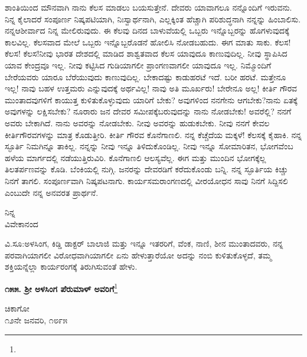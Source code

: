 ಶಾಂತಿಯಿಂದ ಮೌನವಾಗಿ ನಾನು ಕೆಲಸ ಮಾಡಲು ಬಯಸುತ್ತೇನೆ. ದೇವರು ಯಾವಾಗಲೂ ನನ್ನೊಂದಿಗೆ ಇರುವನು. ನಿನ್ನ ಕೈಲಾದರೆ ಸಂಪೂರ್ಣ ನಿಷ್ಕಪಟಿಯಾಗಿ, ನಿಃಸ್ವಾರ್ಥನಾಗಿ, ಎಲ್ಲಕ್ಕಿಂತ ಹೆಚ್ಚಾಗಿ ಪರಿಶುದ್ಧನಾಗಿ ನನ್ನನ್ನು ಹಿಂಬಾಲಿಸು. ನನ್ನ\break ಆಶೀರ್ವಾದ ನಿನ್ನ ಮೇಲಿರುವುದು. ಈ ಕೆಲವು ದಿನದ ಬಾಳುವೆಯಲ್ಲಿ ಒಬ್ಬರು ಇನ್ನೊಬ್ಬರನ್ನು ಹೊಗಳುವುದಕ್ಕೆ ಕಾಲವಿಲ್ಲ. ಕೆಲಸವಾದ ಮೇಲೆ ಒಬ್ಬರು ಇನ್ನೊಬ್ಬರೊಡನೆ ಹೋಲಿಸಿ ನೋಡಬಹುದು. ಈಗ ಮಾತು ಸಾಕು. ಕೆಲಸ! ಕೆಲಸ! ಕೆಲಸ!ನೀವು ಭಾರತ ದೇಶದಲ್ಲಿ ಮಾಡಿದ ಶಾಶ್ವತವಾದ ಕೆಲಸ ಯಾವುದೂ ಕಾಣುವುದಿಲ್ಲ. ನೀವು ಸ್ಥಾಪಿಸಿದ ಯಾವ ಕೇಂದ್ರವೂ ಇಲ್ಲ. ನೀವು ಕಟ್ಟಿಸಿದ ಗುಡಿಯಾಗಲೀ ಪ್ರಾಂಗಣವಾಗಲೀ ಯಾವುದೂ ಇಲ್ಲ. ನಿಮ್ಮೊಂದಿಗೆ ಬೇರೆಯವರು ಯಾರೂ ಬೆರೆಯುವುದು ಕಾಣುವುದಿಲ್ಲ. ಬೇಕಾದಷ್ಟು ಕಾಡುಹರಟೆ ಇದೆ. ಬರೀ ಹರಟೆ. ಮತ್ತೇನೂ ಇಲ್ಲ! ನಾವು ಬಹಳ ಉತ್ತಮರು ಎನ್ನುವುದಕ್ಕೆ ಅರ್ಥವಿಲ್ಲ! ನಾವು ಅತಿ ಮೂರ್ಖರು! ಬೇರೇನೂ ಅಲ್ಲ! ಕೀರ್ತಿ ಗೌರವ ಮುಂತಾದವುಗಳಿಗೆ ಕಾಯುತ್ತ ಕುಳಿತುಕೊಳ್ಳುವುದು ಯಾರಿಗೆ ಬೇಕು? ಅವುಗಳಿಂದ ನನಗೇನು ಆಗಬೇಕು?ನಾನು ಏತಕ್ಕೆ ಅವುಗಳನ್ನು ಲಕ್ಷಿಸಬೇಕು? ನೂರಾರು ಜನ ದೇವರ ಸಮೀಪಕ್ಕೆ\break ಬರುವುದನ್ನು ನಾನು ನೋಡಬೇಕು! ಅವರೆಲ್ಲಿ? ನನಗೆ ಅವರು ಬೇಕಾಗಿದೆ. ನಾನು ಅವರನ್ನು ನೋಡಬೇಕು. ನೀವು ಅವರನ್ನು ಹುಡುಕಬೇಕು. ನೀವು ನನಗೆ ಕೇವಲ ಕೀರ್ತಿಗೌರವಗಳನ್ನು ಮಾತ್ರ ಕೊಡುತ್ತೀರಿ. ಕೀರ್ತಿ ಗೌರವ ಕೊನೆಗಾಣಲಿ. ನನ್ನ ಕೆಚ್ಚೆದೆಯ ಮಕ್ಕಳೆ! ಕೆಲಸಕ್ಕೆ ಕೈಹಾಕಿ. ನನ್ನ ಸ್ಫೂರ್ತಿ ನಿಮಗಿನ್ನೂ ತಾಕಿಲ್ಲ. ನನ್ನನ್ನು ನೀವು ಇನ್ನೂ ತಿಳಿದುಕೊಂಡಿಲ್ಲ. ನೀವು ಇನ್ನೂ ಸೋಮಾರಿತನ, ಭೋಗವೆಂಬ ಹಳೆಯ ಮಾರ್ಗದಲ್ಲಿ ನಡೆಯುತ್ತಿರುವಿರಿ. ಕೊನೆಗಾಣಲಿ ಆಲಸ್ಯವೆಲ್ಲ. ಈಗ ಮತ್ತು ಮುಂದಿನ ಭೋಗಕ್ಕೆಲ್ಲ ತಿಲತರ್ಪಣವನ್ನು ಕೊಡಿ. ಬೆಂಕಿಯಲ್ಲಿ ನುಗ್ಗಿ. ಜನರನ್ನು ದೇವರಡಿಗೆ ಕರೆದುಕೊಂಡು ಬನ್ನಿ. ನನ್ನ ಸ್ಫೂರ್ತಿಯ ಕಿಚ್ಚು ನಿನಗೆ ತಾಗಲಿ. ಸಂಪೂರ್ಣವಾಗಿ ನಿಷ್ಕಪಟನಾಗು. ಕಾರ್ಯಸಮರಾಂಗಣದಲ್ಲಿ ವೀರಯೋಧನ ಸಾವು ನಿನಗೆ ಸಿದ್ದಿಸಲಿ ಎಂಬುದೇ ನನ್ನ ಅನವರತ ಪ್ರಾರ್ಥನೆ.

\vspace{-0.5cm}

{\flushright
ನಿನ್ನ\\ವಿವೇಕಾನಂದ\par}

\medskip

ವಿ.ಸೂ:\enginline{-}ಅಳಸಿಂಗ, ಕಿಡ್ಡಿ ಡಾಕ್ಟರ್ ಬಾಲಾಜಿ ಮತ್ತು ಇನ್ನೂ ಇತರರಿಗೆ, ವೆಂಕ, ನಾಣಿ, ಶೀನ ಮುಂತಾದವರು, ನನ್ನ ಪರವಾಗಿಯಾಗಲೀ ವಿರೋಧವಾಗಿಯಾಗಲೀ ಏನು ಹೇಳುತ್ತಾರೆಯೋ ಅದನ್ನು ನಂಬಿ ಕುಳಿತುಕೊಳ್ಳದೆ, ತಮ್ಮ ಶಕ್ತಿಯನ್ನೆಲ್ಲಾ ಕಾರ್ಯರಂಗಕ್ಕೆ ತಿರುಗಿಸುವಂತೆ ಹೇಳು.

\begin{center}
\textbf{೧೫೫. ಶ‍್ರೀ ಅಳಸಿಂಗ ಪೆರುಮಾಳ್ ಅವರಿಗೆ}\footnote{}
\end{center}

\vspace{-0.7cm}

\begin{flushright}
ಚಿಕಾಗೋ\\೧೨ನೇ ಜನವರಿ, ೧೮೯೫
\end{flushright}

